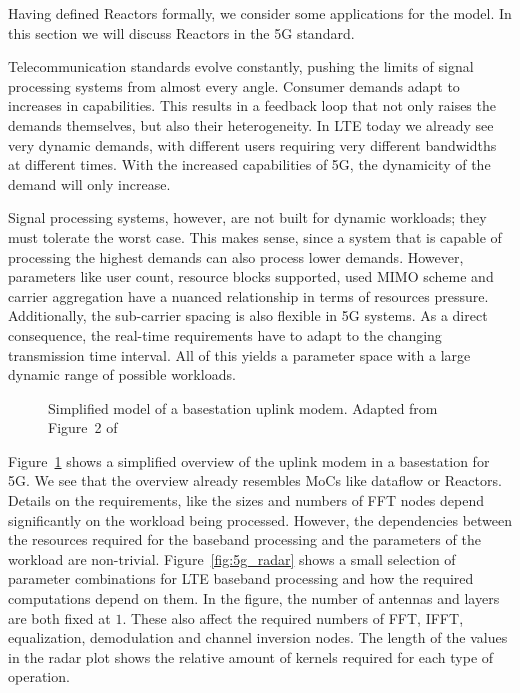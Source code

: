 Having defined Reactors formally, we consider some applications for the model.
In this section we will discuss Reactors in the 5G standard.

Telecommunication standards evolve constantly, pushing the limits of signal processing systems from almost every angle.
Consumer demands adapt to increases in capabilities. This results in a feedback loop that not only raises the demands themselves, but also their heterogeneity.
In \ac{LTE} today we already see very dynamic demands, with different users requiring very different bandwidths at different times.
With the increased capabilities of 5G, the dynamicity of the demand will only increase.

Signal processing systems, however, are not built for dynamic workloads; they must tolerate the worst case.
This makes sense, since a system that is capable of processing the highest demands can also process lower demands.
However, parameters like user count, resource blocks supported, used MIMO scheme and carrier aggregation have a nuanced relationship in terms of resources pressure.
Additionally, the sub-carrier spacing is also flexible in 5G systems.
As a direct consequence, the real-time requirements have to adapt to the changing transmission time interval.
All of this yields a parameter space with a large dynamic range of possible workloads.

\begin{figure}[h]
	\centering
   \resizebox{0.95\textwidth}{!}{}
   \caption{Simplified model of a basestation uplink  modem. Adapted from Figure~2 of~\cite{wittig_ict20}} 
	\label{fig:5g_flow}
\end{figure}

Figure~\ref{fig:5g_flow} shows a simplified overview of the uplink modem in a basestation for 5G. 
We see that the overview already resembles \acp{MoC} like dataflow or Reactors.
Details on the requirements, like the sizes and numbers of \ac{FFT} nodes depend significantly on the workload being processed.
However, the dependencies between the resources required for the baseband processing and the parameters of the workload are non-trivial.
Figure~\ref{fig:5g_radar} shows a small selection of parameter combinations for \ac{LTE} baseband processing and how the required computations depend on them.
In the figure, the number of antennas and layers are both fixed at $1$. These also affect the required numbers of \ac{FFT}, \ac{IFFT}, equalization, demodulation and channel inversion nodes.
The length of the values in the radar plot shows the relative amount of kernels required for each type of operation.

